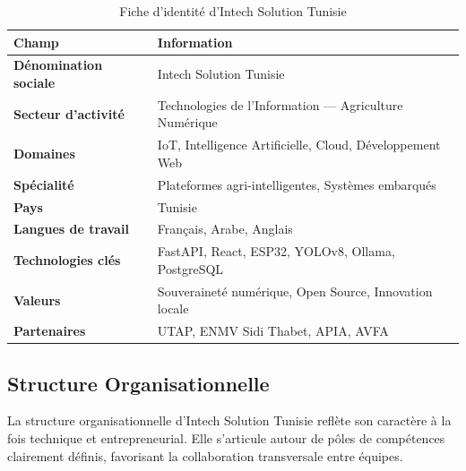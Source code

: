 \documentclass[12pt, a4paper]{report}
\begin{document}
\begin{table}[H]
\centering
\caption{Fiche d'identité d'Intech Solution Tunisie}
\label{tab:intech_fiche}
\begin{tabularx}{\textwidth}{>{\bfseries\color{primary}}l X}
\toprule
\textbf{Champ} & \textbf{Information} \\
\midrule
Dénomination sociale & Intech Solution Tunisie \\
Secteur d'activité & Technologies de l'Information — Agriculture Numérique \\
Domaines & IoT, Intelligence Artificielle, Cloud, Développement Web \\
Spécialité & Plateformes agri-intelligentes, Systèmes embarqués \\
Pays & Tunisie \\
Langues de travail & Français, Arabe, Anglais \\
Technologies clés & FastAPI, React, ESP32, YOLOv8, Ollama, PostgreSQL \\
Valeurs & Souveraineté numérique, Open Source, Innovation locale \\
Partenaires & UTAP, ENMV Sidi Thabet, APIA, AVFA \\
\bottomrule
\end{tabularx}
\end{table}

\subsection{Structure Organisationnelle}

La structure organisationnelle d'Intech Solution Tunisie reflète son caractère à la fois technique et entrepreneurial. Elle s'articule autour de pôles de compétences clairement définis, favorisant la collaboration transversale entre équipes.
\end{document}
